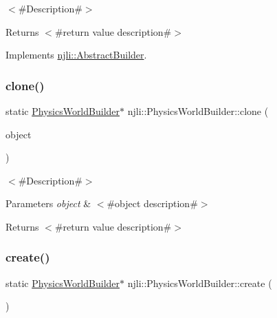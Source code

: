 $<$\#\+Description\#$>$

\begin{DoxyReturn}{Returns}
$<$\#return value description\#$>$ 
\end{DoxyReturn}


Implements \mbox{\hyperlink{classnjli_1_1_abstract_builder_aa1d220053e182c37b31b427499c6eacf}{njli\+::\+Abstract\+Builder}}.

\mbox{\label{classnjli_1_1_physics_world_builder_a7f4d93d89d71f063f9a5c1b4906aaf16}} 
\subsubsection{\texorpdfstring{clone()}{clone()}}
{\footnotesize\ttfamily static \mbox{\hyperlink{classnjli_1_1_physics_world_builder}{Physics\+World\+Builder}}$\ast$ njli\+::\+Physics\+World\+Builder\+::clone (\begin{DoxyParamCaption}\item[{const \mbox{\hyperlink{classnjli_1_1_physics_world_builder}{Physics\+World\+Builder}} \&}]{object }\end{DoxyParamCaption})\hspace{0.3cm}{\ttfamily [static]}}

$<$\#\+Description\#$>$


\begin{DoxyParams}{Parameters}
{\em object} & $<$\#object description\#$>$\\
\hline
\end{DoxyParams}
\begin{DoxyReturn}{Returns}
$<$\#return value description\#$>$ 
\end{DoxyReturn}
\mbox{\label{classnjli_1_1_physics_world_builder_a9171c619f9b0695b9051ae8e770ea4fc}} 
\subsubsection{\texorpdfstring{create()}{create()}}
{\footnotesize\ttfamily static \mbox{\hyperlink{classnjli_1_1_physics_world_builder}{Physics\+World\+Builder}}$\ast$ njli\+::\+Physics\+World\+Builder\+::create (\begin{DoxyParamCaption}{ }\end{DoxyParamCaption})\hspace{0.3cm}{\ttfamily [static]}}

